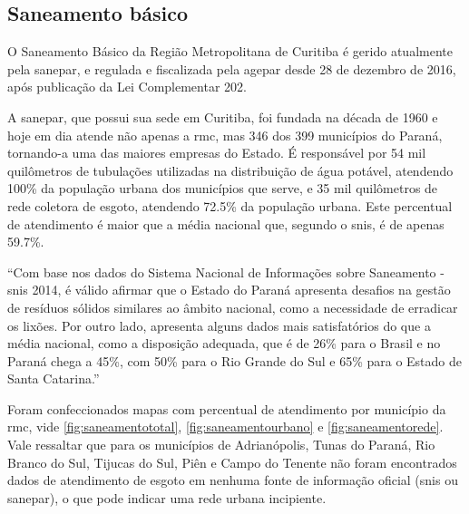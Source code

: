 	\subsection{Saneamento básico}
	
	O Saneamento Básico da Região Metropolitana de Curitiba é gerido atualmente pela \gls{sanepar}, e regulada e fiscalizada pela \gls{agepar} desde 28 de dezembro de 2016, após publicação da Lei Complementar 202.
	
	A \gls{sanepar}, que possui sua sede em Curitiba, foi fundada na década de 1960 e hoje em dia atende não apenas a \gls{rmc}, mas 346 dos 399 municípios do Paraná, tornando-a uma das maiores empresas do Estado. É responsável por 54 mil quilômetros de tubulações utilizadas na distribuição de água potável, atendendo 100\% da população urbana dos municípios que serve, e 35 mil quilômetros de rede coletora de esgoto, atendendo 72.5\% da população urbana. Este percentual de atendimento é maior que a média nacional que, segundo o \gls{snis}, é de apenas 59.7\%. 
	
	\begin{citacao}
		``Com base nos dados do Sistema Nacional de Informações sobre Saneamento - \gls{snis} 2014, é válido afirmar que o Estado do Paraná apresenta desafios na gestão de resíduos sólidos similares ao âmbito nacional, como a necessidade de erradicar os lixões. Por outro lado, apresenta alguns dados mais satisfatórios do que a média nacional, como a disposição adequada, que é de 26\% para o Brasil e no Paraná chega a 45\%, com 50\% para o Rio Grande do Sul e 65\% para o Estado de Santa Catarina.'' \cite{anjos2016a}
	\end{citacao}

	Foram confeccionados mapas com percentual de atendimento por município da \gls{rmc}, vide \autoref{fig:saneamentototal}, \autoref{fig:saneamentourbano} e \autoref{fig:saneamentorede}. Vale ressaltar que para os municípios de Adrianópolis, Tunas do Paraná, Rio Branco do Sul, Tijucas do Sul, Piên e Campo do Tenente não foram encontrados dados de atendimento de esgoto em nenhuma fonte de informação oficial (\gls{snis} ou \gls{sanepar}), o que pode indicar uma rede urbana incipiente.
	
